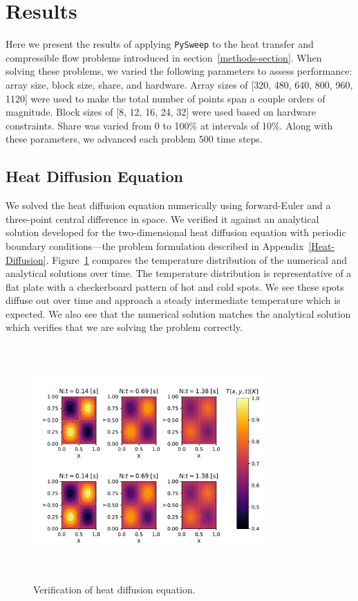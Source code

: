 \documentclass[preprints,article,accept,moreauthors,pdftex]{Definitions/mdpi}
\def\pysweep{\texttt{PySweep}}
\begin{document}
\section{Results}
\label{results-section}

Here we present the results of applying \pysweep{} to the heat transfer and compressible flow problems introduced in section~\ref{methods-section}. When solving these problems, we varied the following parameters to assess performance: array size, block size, share, and hardware. Array sizes of [320, 480, 640, 800, 960, 1120] were used to make the total number of points span a couple orders of magnitude. Block sizes of [8, 12, 16, 24, 32] were used based on hardware constraints. Share was varied from 0 to 100\% at intervals of 10\%. Along with these parameters, we advanced each problem 500 time steps.

\subsection{Heat Diffusion Equation}
\label{hdeResults}

We solved the heat diffusion equation numerically using forward-Euler and a three-point central difference in space. We verified it against an analytical solution developed for the two-dimensional heat diffusion equation with periodic boundary conditions---the problem formulation described in Appendix~\ref{Heat-Diffusion}. Figure~\ref{fig:heatSurface} compares the temperature distribution of the numerical and analytical solutions over time. The temperature distribution is representative of a flat plate with a checkerboard pattern of hot and cold spots. We see these spots diffuse out over time and approach a steady intermediate temperature which is expected. We also see that the numerical solution matches the analytical solution which verifies that we are solving the problem correctly.

\begin{figure}[htbp]
    \centering
    \includegraphics[height=9cm,width=0.78\textwidth, trim={0.9cm 0.3cm 0.1cm 0.9cm},clip]{figs/heatValidate.pdf}
    \caption{Verification of heat diffusion equation.}
    \label{fig:heatSurface}
\end{figure}
\end{document}
